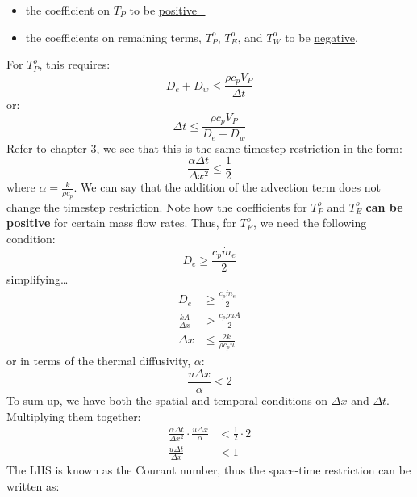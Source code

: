 \documentclass[11pt]{article}
\begin{document}
\begin{itemize}
\item the coefficient on \(T_P\) to be \uline{positive\_}
\item the coefficients on remaining terms, \(T_P^o\), \(T_E^o\), and \(T_W^o\) to be \uline{negative}.
\end{itemize}
For \(T_P^o\), this requires:
\begin{equation*}
D_e + D_w \leq \frac{\rho c_p V_P}{\Delta t}
\end{equation*}
or:
\begin{equation*}
\Delta t \leq \frac{\rho c_p V_P}{D_e + D_w}
\end{equation*}
Refer to chapter 3, we see that this is the same timestep restriction in the form:
\begin{equation*}
\boxed{\frac{\alpha \Delta t}{\Delta x^2} \leq \frac{1}{2}}
\end{equation*}
where \(\alpha = \frac{k}{\rho c_p}\). We can say that the addition of the advection term does not change the timestep restriction.
Note how the coefficients for \(T_P^o\) and \(T_E^o\) \textbf{can be positive} for certain mass flow rates. Thus, for \(T_E^o\), we need the following
condition:
\begin{equation*}
D_e \geq \frac{c_p \dot{m}_e}{2}
\end{equation*}
simplifying\ldots{}
\begin{equation*}
\begin{aligned}
D_e & \geq \frac{c_p \dot{m}_e}{2}\\
\frac{kA}{\Delta x} & \geq \frac{c_p \rho u A}{2}\\
\Delta x &\leq \frac{2k}{\rho c_p u}
\end{aligned}
\end{equation*}
or in terms of the thermal diffusivity, \(\alpha\):
\begin{equation*}
\boxed{\frac{u \Delta x}{\alpha} < 2 }
\end{equation*}
To sum up, we have both the spatial and temporal conditions on \(\Delta x\) and \(\Delta t\). Multiplying them together:
\begin{equation*}
\begin{aligned}
\frac{\alpha \Delta t}{\Delta x^2}\cdot \frac{u \Delta x}{\alpha} &< \frac{1}{2}\cdot 2\\
\frac{u \Delta t}{\Delta x} &< 1
\end{aligned}
\end{equation*}
The LHS is known as the Courant number, thus the space-time restriction can be written as:
\end{document}
